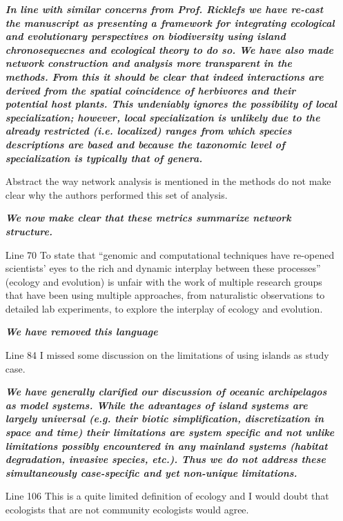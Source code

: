 \documentclass[12pt]{article}
\begin{document}
\begin{itemize}
  \textit{\textbf{In line with similar concerns from Prof. Ricklefs we
      have re-cast the manuscript as presenting a framework for
      integrating ecological and evolutionary perspectives on
      biodiversity using island chronosequecnes and ecological theory
      to do so. We have also made network construction and analysis
      more transparent in the methods. From this it should be clear
      that indeed interactions are derived from the spatial
      coincidence of herbivores and their potential host plants. This
      undeniably ignores the possibility of local specialization;
      however, local specialization is unlikely due to the already
      restricted (i.e. localized) ranges from which species
      descriptions are based and because the taxonomic level of
      specialization is typically that of genera.}}
%
\item[Abstract] the way network analysis is mentioned in the methods
  do not make clear why the authors performed this set of analysis.

  \textit{\textbf{We now make clear that these metrics summarize
      network structure.}}
%
\item[Line 70] To state that ``genomic and computational techniques
  have re-opened scientists' eyes to the rich and dynamic interplay
  between these processes'' (ecology and evolution) is unfair with the
  work of multiple research groups that have been using multiple
  approaches, from naturalistic observations to detailed lab
  experiments, to explore the interplay of ecology and evolution.

  \textit{\textbf{We have removed this language}}
%
\item[Line 84] I missed some discussion on the limitations of using
  islands as study case.

  \textit{\textbf{We have generally clarified our discussion of
      oceanic archipelagos as model systems. While the advantages of
      island systems are largely universal (e.g. their biotic
      simplification, discretization in space and time) their
      limitations are system specific and not unlike limitations
      possibly encountered in any mainland systems (habitat
      degradation, invasive species, etc.). Thus we do not address
      these simultaneously case-specific and yet non-unique
      limitations.}}
%
\item[Line 106] This is a quite limited definition of ecology and I
  would doubt that ecologists that are not community ecologists would
  agree.


\end{itemize}
\end{document}
